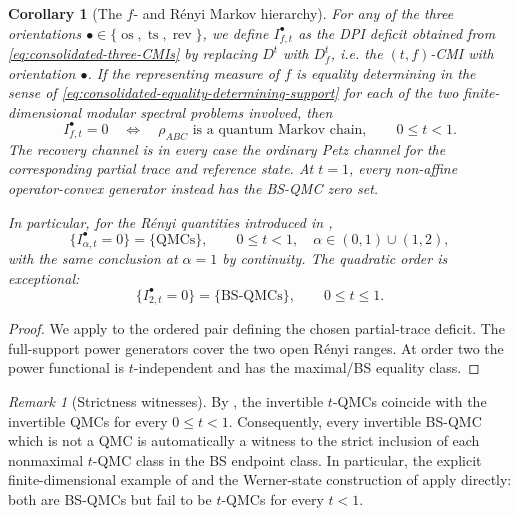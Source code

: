 \documentclass[11pt]{article}
\newtheorem{corollary}[corollary]{Corollary}
\theoremstyle{remark}
\newtheorem{remark}[remark]{Remark}
\DeclareMathOperator{\os}{os}
\DeclareMathOperator{\ts}{ts}
\DeclareMathOperator{\rev}{rev}
\newcommand{\1}{\mathbbm{1}}
\begin{document}
\begin{corollary}[The $f$- and R\'enyi Markov hierarchy]
\label{cor:consolidated-f-Renyi-tQMC-hierarchy}
For any of the three orientations
$\bullet\in\{\os,\ts,\rev\}$, we define
$I_{f,t}^\bullet$ as the DPI deficit obtained from
\eqref{eq:consolidated-three-CMIs} by replacing $D^t$ with
$D_f^t$, i.e. the $(t,f)$-CMI with orientation $\bullet$.  If the
representing measure of $f$ is equality determining in the sense of
\eqref{eq:consolidated-equality-determining-support} for each of the two
finite-dimensional modular spectral problems involved, then
\begin{equation}
 I_{f,t}^\bullet=0
 \quad\Longleftrightarrow\quad
 \rho_{ABC}\text{ is a quantum Markov chain},
 \qquad 0\leq t<1.
\end{equation}
The recovery channel is in every case the ordinary Petz channel for
the corresponding partial trace and reference state.  At $t=1$,
every non-affine operator-convex generator instead has the BS-QMC
zero set.

In particular, for the R\'enyi quantities introduced in
,
\begin{equation}
 \{I_{\alpha,t}^\bullet=0\}
 =\{\text{QMCs}\},
 \qquad
 0\leq t<1,\quad
 \alpha\in(0,1)\cup(1,2),
\end{equation}
with the same conclusion at $\alpha=1$ by continuity.  The
quadratic order is exceptional:
\begin{equation}
 \{I_{2,t}^\bullet=0\}
 =\{\text{BS-QMCs}\},
 \qquad 0\leq t\leq1.
\end{equation}
\end{corollary}

\begin{proof}
We apply  to the ordered
pair defining the chosen partial-trace deficit.  The full-support
power generators cover the two open R\'enyi ranges.  At order two the
power functional is $t$-independent and has the maximal/BS equality
class.
\end{proof}

\begin{remark}[Strictness witnesses]
By , the invertible $t$-QMCs
coincide with the invertible QMCs for every $0\leq t<1$.
Consequently, every invertible BS-QMC which is not a QMC is
automatically a witness to the strict inclusion of each nonmaximal
$t$-QMC class in the BS endpoint class.  In particular, the explicit
finite-dimensional example of \cite[Example~4.1]{Bluhm:2025kai} and
the Werner-state construction of
\cite[Proposition~4.3]{Bluhm:2025kai} apply directly: both are
BS-QMCs but fail to be $t$-QMCs for every $t<1$.
\end{remark}
\end{document}
